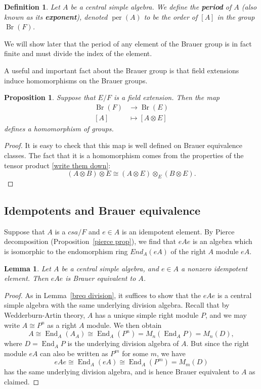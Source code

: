 \documentclass[12pt]{report}
\theoremstyle{plain}
\newtheorem{defn}[thm]{Definition}
\newtheorem{lem}[thm]{Lemma}
\newtheorem{prop}[thm]{Proposition}
\newcommand{\oper}[1]{\operatorname{#1}}
\newcommand{\End}{\oper{End}}
\newcommand{\per}{\oper{per}}
\newcommand{\Br}{\oper{Br}}
\newcommand{\Xb}[1]{\textbf{#1}\index{#1}}
\begin{document}
\begin{defn}
Let $A$ be a central simple algebra. We define the \Xb{period} of $A$ (also
known as its \Xb{exponent}), denoted $\per(A)$ to be the order of $[A]$ in
the group $\Br(F)$.
\end{defn}

We will show later that the period of any element of the Brauer group is in
fact finite and must divide the index of the element.

A useful and important fact about the Brauer group is that field extensions
induce homomorphisms on the Brauer groups.

\begin{prop} \label{proposition-brauer-group-a-functor-on-fields}
Suppose that $E/F$ is a field extension. Then the map
\begin{align*}
\Br(F) &\to \Br(E) \\
[A] &\mapsto [A \otimes E]
\end{align*}
defines a homomorphism of groups.
\end{prop}
\begin{proof}
It is easy to check that this map is well defined on Brauer equivalence
classes. The fact that it is a homomorphism comes from the properties of
the tensor product \ref{write them down}:
\[(A \otimes B) \otimes E \cong (A \otimes E) \otimes_E (B \otimes E). \]
\end{proof}

\subsection{Idempotents and Brauer equivalence}

Suppose that $A$ is a $csa/F$ and $e \in A$ is an idempotent element. By
Pierce decomposition (Proposition~\ref{pierce prop}), we find that $eAe$ is
an algebra which is isomorphic to the endomorphism ring $End_A(eA)$ of the
right $A$ module $eA$.

\begin{lem}
Let $A$ be a central simple algebra, and $e \in A$ a nonzero idempotent
element. Then $eAe$ is Brauer equivalent to $A$.
\end{lem}
\begin{proof}
As in Lemma~\ref{breq division}, it suffices to show that the $eAe$ is a
central simple algebra with the same underlying division algebra. Recall
that by Wedderburn-Artin theory, $A$ has a unique simple right module $P$,
and we may write $A \cong P^n$ as a right $A$ module. We then obtain
\[A \cong \End_{A}(A_A) \cong \End_A(P^n) = M_n(\End_A P) = M_n(D),\]
where $D = \End_A P$ is the underlying division algebra of $A$. But since
the right module $eA$ can also be written as $P^m$ for some $m$, we have
\[eAe \cong \End_A(eA) \cong \End_A(P^m) = M_m(D)\]
has the same underlying division algebra, and is hence Brauer equivalent to
$A$ as claimed.
\end{proof}
\end{document}
